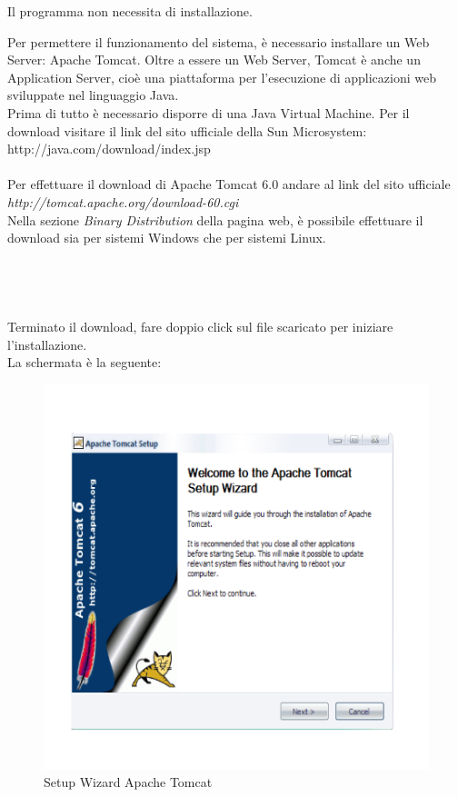  
Il programma non necessita di installazione.
 
Per permettere il funzionamento del sistema, \`e necessario installare un Web Server: Apache Tomcat. Oltre a essere un Web Server, Tomcat \`e anche un
Application Server, cio\`e una piattaforma per l'esecuzione di applicazioni web sviluppate nel linguaggio Java.\\
Prima di tutto \`e necessario disporre di una Java Virtual Machine. Per il download visitare il link del sito ufficiale della Sun Microsystem:\\
http://java.com/download/index.jsp\\
\\
Per effettuare il download di Apache Tomcat 6.0 andare al link del sito ufficiale \textit{http://tomcat.apache.org/download-60.cgi}\\
Nella sezione \textit{Binary Distribution} della pagina web, \`e possibile effettuare il download sia per sistemi Windows che per sistemi Linux.\\
\\\\
\\
\\
Terminato il download, fare doppio click sul file scaricato per iniziare l'installazione.\\
La schermata \`e la seguente:
 
\begin{figure}[!ht]
\centering
\includegraphics[scale=0.7]{images/InstallTomcat1.png}
\caption{Setup Wizard Apache Tomcat}

\end{figure} 


